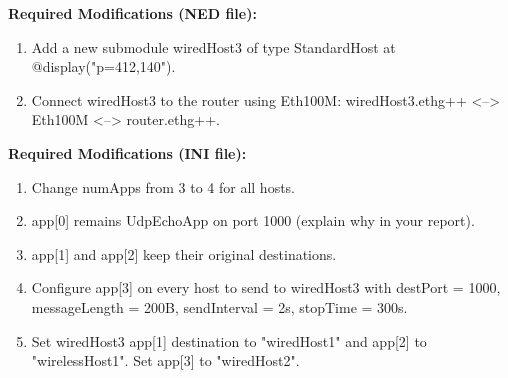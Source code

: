 \documentclass[12pt]{article}
\begin{document}
\textbf{Required Modifications (NED file):}
\begin{enumerate}
    \item Add a new submodule wiredHost3 of type StandardHost at @display("p=412,140").
    \item Connect wiredHost3 to the router using Eth100M: wiredHost3.ethg++ <--> Eth100M <--> router.ethg++.
\end{enumerate}

\textbf{Required Modifications (INI file):}
\begin{enumerate}
    \item Change numApps from 3 to 4 for all hosts.
    \item app[0] remains UdpEchoApp on port 1000 (explain why in your report).
    \item app[1] and app[2] keep their original destinations.
    \item Configure app[3] on every host to send to wiredHost3 with destPort = 1000, messageLength = 200B, sendInterval = 2s, stopTime = 300s.
    \item Set wiredHost3 app[1] destination to "wiredHost1" and app[2] to "wirelessHost1". Set app[3] to "wiredHost2".
\end{enumerate}
\end{document}
